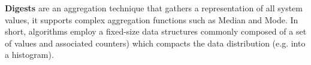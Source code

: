 \textbf{Digests} are an aggregation technique that gathers a representation of all system values, it supports complex aggregation functions such as Median and Mode. In short, algorithms employ a fixed-size data structures commonly composed of a set of values and associated counters) which compacts the data distribution (e.g. into a histogram).








